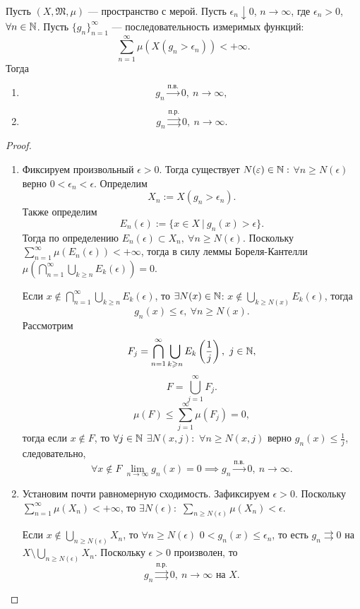 \begin{corollary}
    Пусть $(X, \mathfrak{M}, \mu)$ — пространство с мерой.
    Пусть $\epsilon_n \downarrow 0$, $n \to \infty$, где $\epsilon_n > 0$, $\forall n \in \mathbb{N}$.
    Пусть $\{g_n\}_{n=1}^\infty$ — последовательность измеримых функций:
    \[\sum\limits_{n=1}^{\infty} \mu(X(g_n > \epsilon_n)) < + \infty.\]
    Тогда
    \begin{enumerate}
        \item \[g_n \xrightarrow{\text{п.в.}} 0, \ n \to \infty,\]
        \item \[g_n \overset{\text{п.р.}}{\rightrightarrows} 0, \ n \to \infty.\]
    \end{enumerate}
\end{corollary}
\begin{proof}\tab
\begin{enumerate}
    \item Фиксируем произвольный $\epsilon > 0$.
    Тогда существует $N(\varepsilon) \in \mathbb{N}:$ $\forall n \geqslant N(\epsilon)$ верно $0 < \epsilon_n < \epsilon$.
    Определим
    \[X_n := X(g_n > \epsilon_n).\]
    Также определим
    \[E_n(\epsilon) := \{x \in X \ | \ g_n(x) > \epsilon\}.\]
    Тогда по определению $E_n(\epsilon) \subset X_n, \ \forall n \geqslant N(\epsilon)$.
    Поскольку $\sum\limits_{n=1}^{\infty}\mu(E_n(\epsilon)) < + \infty$, тогда в силу леммы Бореля-Кантелли
    $\mu\left(\bigcap\limits_{n=1}^{\infty} \bigcup\limits_{k \geqslant n}E_k(\epsilon)\right) = 0$.

    Если $x \notin \bigcap\limits_{n=1}^{\infty} \bigcup\limits_{k \geqslant n}E_k(\epsilon)$,
    то $\exists N(x) \in \mathbb{N}$: $x \notin \bigcup\limits_{k \geqslant N(x)}E_k(\epsilon)$,
    тогда
    \[g_n(x) \leqslant \epsilon, \ \forall n \geqslant N(x).\]
    Рассмотрим
    \[F_j = \bigcap\limits_{n=1}^{\infty} \bigcup\limits_{k\geqslant n} E_k\left(\frac{1}{j}\right), \ j \in \mathbb{N},\]
    \[F = \bigcup\limits_{j=1}^{\infty}F_j.\]
    \[\mu(F) \leqslant \sum\limits_{j=1}^{\infty} \mu(F_j) = 0,\]
    тогда если $x \notin F$, то $\forall j \in \mathbb{N}$ $\exists N(x,j):$ $\forall n \geqslant N(x,j)$ верно $g_n(x) \leqslant \frac{1}{j}$, следовательно,
    \[\forall x \notin F \ \lim\limits_{n \to \infty} g_n(x) = 0
    \implies
    g_n \xrightarrow{\text{п.в.}} 0, \ n \to \infty.\]

    \item Установим почти равномерную сходимость.
    Зафиксируем $\epsilon > 0$.
    Поскольку $\sum\limits_{n=1}^{\infty} \mu(X_n) < +\infty$,
    то $\exists N(\epsilon):$ $\sum\limits_{n \geqslant N(\epsilon)} \mu(X_n) < \epsilon$.

    Если $x \notin \bigcup\limits_{n \geqslant N(\epsilon)} X_n$,
    то $\forall n \geqslant N(\epsilon)$ $0 < g_n(x) \leqslant \epsilon_n$,
    то есть $g_n \rightrightarrows 0$ на $X \setminus \bigcup\limits_{n \geqslant N(\epsilon)}X_n$.
    Поскольку $\epsilon > 0$ произволен, то
    \[g_n \overset{\text{п.р.}}{\rightrightarrows} 0, \ n \to \infty \text{ на } X.\]
\end{enumerate}
\end{proof} 

